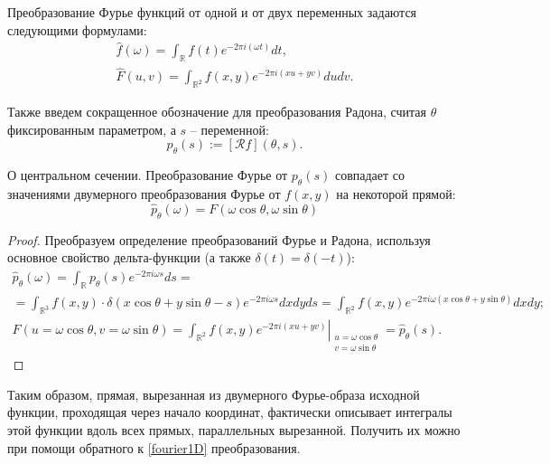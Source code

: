 
Преобразование Фурье функций от одной и от двух переменных задаются следующими формулами:
\begin{gather}
\label{fourier1D}
    \hat{f}(\omega) = \int_{\mathbb{R}} f(t) e^{-2\pi i (\omega t)} dt,\\
\label{fourier2D}
    \hat{F}(u, v) = \int_{\mathbb{R}^2} f(x, y) e^{-2\pi i (xu + yv)} du dv.
\end{gather}

Также введем сокращенное обозначение для преобразования Радона, считая $\theta$ фиксированным параметром, а $s$ -- переменной:
\begin{equation*}
    p_\theta(s) := \left[ \mathcal{R}f \right]\left( \theta, s \right).
\end{equation*}

\begin{theorem}{О центральном сечении.}
\label{fourier_slice_thm}
    Преобразование Фурье от $p_\theta(s)$ совпадает со значениями двумерного преобразования Фурье от $f(x, y)$ на некоторой прямой:
    \begin{equation*}
        \hat{p}_\theta(\omega) = F(\omega\cos\theta, \omega\sin\theta)
    \end{equation*}
\end{theorem}
\begin{proof}
    Преобразуем определение преобразований Фурье и Радона, используя основное свойство дельта-функции (а также $\delta(t) = \delta(-t)$):
    \begin{gather*}
        \hat{p}_\theta(\omega) =
        \int_{\mathbb{R}} p_\theta(s) e^{-2\pi i \omega s} ds =\\=
        \int_{\mathbb{R}^3} f(x, y) \cdot \delta(x\cos\theta + y\sin\theta - s) e^{-2\pi i \omega s} dx dy ds =
        \int_{\mathbb{R}^2} f(x, y) e^{-2\pi i \omega \left( x\cos\theta + y\sin\theta \right)} dx dy;\\
        F(u=\omega\cos\theta, v=\omega\sin\theta) =
        \left.\int_{\mathbb{R}^2} f(x, y) e^{-2\pi i \left( x u + y v \right)}\right|_{\substack{u=\omega\cos\theta\\v=\omega\sin\theta}} =
        \hat{p}_\theta(s).
    \end{gather*}
\end{proof}

Таким образом, прямая, вырезанная из двумерного Фурье-образа исходной функции, проходящая через начало координат, фактически описывает интегралы этой функции вдоль всех прямых, параллельных вырезанной. Получить их можно при помощи обратного к \eqref{fourier1D} преобразования.
